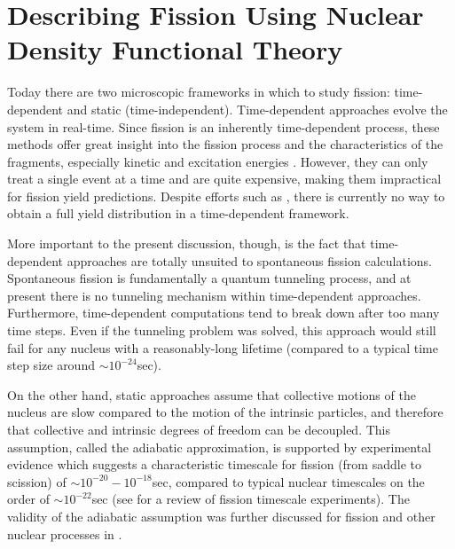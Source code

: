 \chapter{Describing Fission Using Nuclear Density Functional Theory}\label{chap:Model}


Today there are two microscopic frameworks in which to study fission: time-dependent and static (time-independent). Time-dependent approaches evolve the system in real-time. Since fission is an inherently time-dependent process, these methods offer great insight into the fission process and the characteristics of the fragments, especially kinetic and excitation energies \cite{Scamps2018, Scamps2015a, Simenel2014, Grineviciute2018, Umar2010}. However, they can only treat a single event at a time and are quite expensive, making them impractical for fission yield predictions. Despite efforts such as \cite{Scamps2015, Bulgac2018}, there is currently no way to obtain a full yield distribution in a time-dependent framework.

More important to the present discussion, though, is the fact that time-dependent approaches are totally unsuited to spontaneous fission calculations. Spontaneous fission is fundamentally a quantum tunneling process, and at present there is no tunneling mechanism within time-dependent approaches. Furthermore, time-dependent computations tend to break down after too many time steps. Even if the tunneling problem was solved, this approach would still fail for any nucleus with a reasonably-long lifetime (compared to a typical time step size around $\sim10^{-24}$sec).

On the other hand, static approaches assume that collective motions of the nucleus are slow compared to the motion of the intrinsic particles, and therefore that collective and intrinsic degrees of freedom can be decoupled. This assumption, called the adiabatic approximation, is supported by experimental evidence which suggests a characteristic timescale for fission (from saddle to scission) of $\sim10^{-20}-10^{-18}$sec, compared to typical nuclear timescales on the order of $\sim10^{-22}$sec (see \cite{Jacquet2009} for a review of fission timescale experiments). The validity of the adiabatic assumption was further discussed for fission and other nuclear processes in \cite{Nazarewicz1993}.

